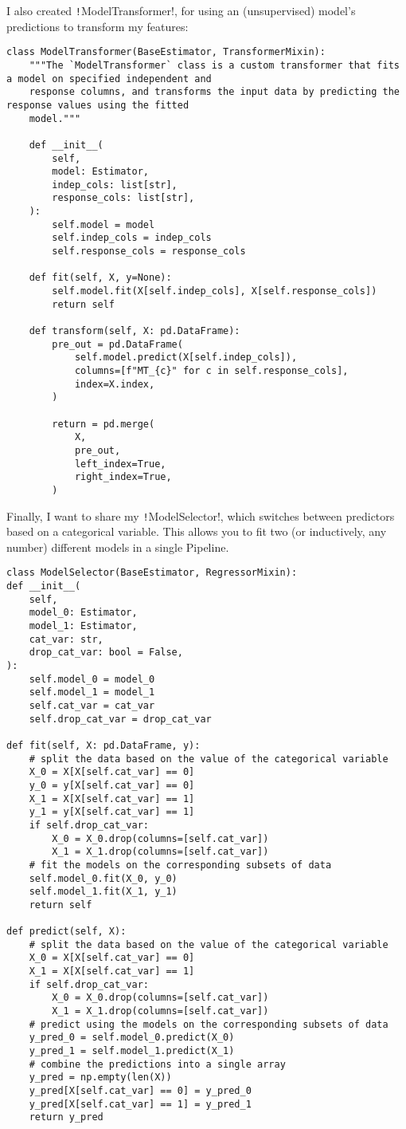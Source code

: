 \documentclass[11pt]{article}
\theoremstyle{definition}
\begin{document}
I also created \texttt!ModelTransformer!, for using an (unsupervised) model's predictions to transform my features:
\begin{verbatim}
class ModelTransformer(BaseEstimator, TransformerMixin):
    """The `ModelTransformer` class is a custom transformer that fits a model on specified independent and
    response columns, and transforms the input data by predicting the response values using the fitted
    model."""

    def __init__(
        self,
        model: Estimator,
        indep_cols: list[str],
        response_cols: list[str],
    ):
        self.model = model
        self.indep_cols = indep_cols
        self.response_cols = response_cols

    def fit(self, X, y=None):
        self.model.fit(X[self.indep_cols], X[self.response_cols])
        return self

    def transform(self, X: pd.DataFrame):
        pre_out = pd.DataFrame(
            self.model.predict(X[self.indep_cols]),
            columns=[f"MT_{c}" for c in self.response_cols],
            index=X.index,
        )

        return = pd.merge(
            X,
            pre_out,
            left_index=True,
            right_index=True,
        )
\end{verbatim}

Finally, I want to share my \texttt!ModelSelector!, which switches between predictors based on a categorical variable. This allows you to fit two (or inductively, any number) different models in a single Pipeline.
\begin{verbatim}
class ModelSelector(BaseEstimator, RegressorMixin):
def __init__(
    self,
    model_0: Estimator,
    model_1: Estimator,
    cat_var: str,
    drop_cat_var: bool = False,
):
    self.model_0 = model_0  
    self.model_1 = model_1 
    self.cat_var = cat_var
    self.drop_cat_var = drop_cat_var

def fit(self, X: pd.DataFrame, y):
    # split the data based on the value of the categorical variable
    X_0 = X[X[self.cat_var] == 0]
    y_0 = y[X[self.cat_var] == 0]
    X_1 = X[X[self.cat_var] == 1]
    y_1 = y[X[self.cat_var] == 1]
    if self.drop_cat_var:
        X_0 = X_0.drop(columns=[self.cat_var])
        X_1 = X_1.drop(columns=[self.cat_var])
    # fit the models on the corresponding subsets of data
    self.model_0.fit(X_0, y_0)
    self.model_1.fit(X_1, y_1)
    return self

def predict(self, X):
    # split the data based on the value of the categorical variable
    X_0 = X[X[self.cat_var] == 0]
    X_1 = X[X[self.cat_var] == 1]
    if self.drop_cat_var:
        X_0 = X_0.drop(columns=[self.cat_var])
        X_1 = X_1.drop(columns=[self.cat_var])
    # predict using the models on the corresponding subsets of data
    y_pred_0 = self.model_0.predict(X_0)
    y_pred_1 = self.model_1.predict(X_1)
    # combine the predictions into a single array
    y_pred = np.empty(len(X))
    y_pred[X[self.cat_var] == 0] = y_pred_0
    y_pred[X[self.cat_var] == 1] = y_pred_1
    return y_pred
\end{verbatim}
\end{document}
